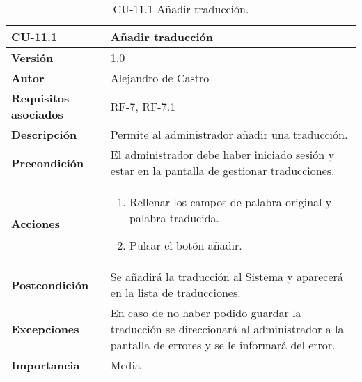 \begin{table}[p]
	\centering
	\begin{tabularx}{\linewidth}{ p{} p{} }
		\toprule
		\textbf{CU-11.1}    & \textbf{Añadir traducción}\\
		\toprule
		\textbf{Versión}              & 1.0    \\
		\textbf{Autor}                & {Alejandro de Castro} \\
		\textbf{Requisitos asociados} & RF-7, RF-7.1 \\
		\textbf{Descripción}          & Permite al administrador añadir una traducción. \\
		\textbf{Precondición}         & El administrador debe haber iniciado sesión y estar en la pantalla de gestionar traducciones. \\
        \textbf{Acciones}             &
		\begin{enumerate}
			\def\labelenumi{\arabic{enumi}.}
			\tightlist
            \item Rellenar los campos de palabra original y palabra traducida.
			\item Pulsar el botón añadir.
		\end{enumerate}\\ 
		\textbf{Postcondición}        & Se añadirá la traducción al Sistema y aparecerá en la lista de traducciones. \\
		\textbf{Excepciones}          & En caso de no haber podido guardar la traducción se direccionará al administrador a la pantalla de errores y se le informará del error. \\
		\textbf{Importancia}          & Media \\
		\bottomrule
	\end{tabularx}
	\caption{CU-11.1 Añadir traducción.}
\end{table}

